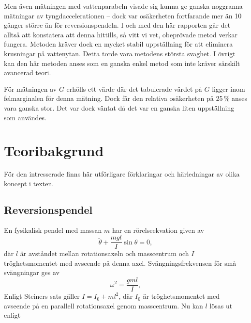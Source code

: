 \documentclass[11pt,a4paper]{article}
\begin{document}
Men även mätningen med vattenparabeln visade sig kunna ge ganska noggranna mätningar av tyngdaccelerationen -- dock var osäkerheten fortfarande mer än 10 gånger större än för reversionspendeln. 
I och med den här rapporten går det alltså att konstatera att denna hittills, så vitt vi vet, obeprövade metod verkar fungera. %
Metoden kräver dock en mycket stabil uppställning för att eliminera krusningar på vattenytan. Detta torde vara metodens största svaghet. I övrigt kan den här metoden anses som en ganska enkel metod som inte kräver särskilt avancerad teori.

För mätningen av $G$ erhölls ett värde där det tabulerade värdet på $G$ ligger inom felmarginalen för denna mätning. Dock får den relativa osäkerheten på 25\,\% anses vara ganska stor. Det var dock väntat då det var en ganska liten uppställning som användes. 















\clearpage
\appendix
\setcounter{page}{1}
\renewcommand*{\thepage}{A\arabic{page}}



\section{Teoribakgrund}
För den intresserade finns här utförligare förklaringar och härledningar av olika koncept i texten. 

\subsection{Reversionspendel}
En fysikalisk pendel med massan $m$ har en rörelseekvation given av \cite{beckman}
\[ \ddot\theta + \frac{mgl}{I}\sin\theta = 0,\]
där $l$ är avståndet mellan rotationsaxeln och masscentrum och $I$ tröghetsmomentet med avseende på denna axel. Svängningsfrekvensen för små svängningar ges av 
\begin{equation}
\omega^2 = \frac{gml}{I},
\label{omega}
\end{equation}
 Enligt Steiners sats gäller $I=I_0+ml^2$, där $I_0$ är tröghetsmomentet med avseende på en parallell rotationsaxel genom masscentrum. Nu kan $l$ lösas ut enligt \cite{kater}
\end{document}
